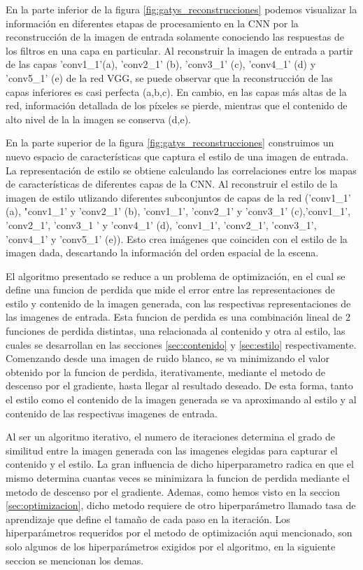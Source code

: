 \documentclass[a4paper,11pt,spanish]{book}
\begin{document}
      En la parte inferior de la figura \ref{fig:gatys_reconstrucciones} podemos visualizar la información en diferentes etapas de procesamiento en la CNN por la reconstrucción
      de la imagen de entrada solamente conociendo las respuestas de los filtros en una capa en particular. 
      Al reconstruir la imagen de entrada a partir de las capas 'conv1\_1'(a), 'conv2\_1' (b), 'conv3\_1' (c), 'conv4\_1' (d) y 'conv5\_1' (e) de la red VGG,
      se puede observar que la reconstrucción de las capas inferiores es casi perfecta (a,b,c). 
      En cambio, en las capas más altas de la red, información detallada de los píxeles se pierde, mientras que el contenido de alto nivel  de la la imagen se conserva (d,e). 
	
      En la parte superior de la figura \ref{fig:gatys_reconstrucciones} construimos un nuevo espacio de características que captura el estilo de una imagen de entrada.
      La representación de estilo se obtiene calculando las correlaciones entre los mapas de características de diferentes capas de la CNN. Al reconstruir el estilo de la imagen de estilo
      utlizando diferentes subconjuntos de capas de la red ('conv1\_1' (a), "conv1\_1' y 'conv2\_1' (b), 'conv1\_1', 'conv2\_1' y 'conv3\_1' (c),'conv1\_1', 'conv2\_1', 'conv3\_1 ' y 'conv4\_1' (d),
      'conv1\_1', 'conv2\_1', 'conv3\_1', 'conv4\_1' y 'conv5\_1' (e)).
      Esto crea imágenes que coinciden con el estilo de la imagen dada, descartando la información del orden espacial de la escena.
      
      El algoritmo presentado se reduce a un problema de optimización, en el cual se define una funcion de perdida que mide el error entre las representaciones de estilo y contenido 
      de la imagen generada, con las respectivas representaciones de las imagenes de entrada.
      Esta funcion de perdida es una combinación lineal de 2 funciones de perdida distintas, una relacionada al contenido y otra al estilo, las cuales se desarrollan en las secciones \ref{sec:contenido} y \ref{sec:estilo} respectivamente.
      Comenzando desde una imagen de ruido blanco, se va minimizando el valor obtenido por la funcion de perdida, iterativamente, mediante el metodo de descenso por el gradiente, hasta 
      llegar al resultado deseado.
      De esta forma, tanto el estilo como el contenido de la imagen generada se va aproximando al estilo y al contenido de las respectivas imagenes de entrada.
      
      Al ser un algoritmo iterativo, el numero de iteraciones determina el grado de similitud entre la imagen generada con las imagenes elegidas para capturar el contenido y el estilo. 
      La gran influencia de dicho hiperparametro radica en que el mismo determina cuantas veces se minimizara la funcion de perdida mediante el metodo de descenso por el gradiente.
      Ademas, como hemos visto en la seccion \ref{sec:optimizacion}, dicho metodo requiere de otro hiperparámetro llamado tasa de aprendizaje que define el tamaño de cada 
      paso en la iteración.
      Los hiperparámetros requeridos por el metodo de optimización aqui mencionado, son solo algunos de los hiperparámetros exigidos por el algoritmo, en la siguiente seccion se mencionan los demas.
      
\end{document}
